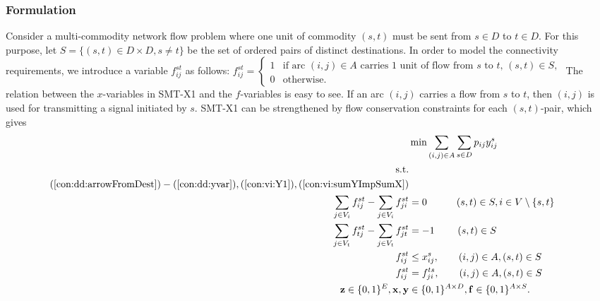 \subsubsection{Formulation}
\label{sec:smtx2:form}
Consider a multi-commodity network flow problem where one unit of commodity $(s,t)$ must be sent from $s\in D$ to $t\in D$. For this purpose, let $S=\{(s,t)\in D\times D, s\neq t\}$ be the set of ordered pairs of distinct destinations. In order to model the connectivity requirements, we introduce a variable $f^{st}_{ij}$ as follows:
\newline\newline
  $f_{ij}^{st}=
	\begin{cases}
    1 & \text{if arc $(i,j) \in A$ carries 1 unit of flow from $s$ to $t$, $(s,t)\in S$},\\
    0 & \text{otherwise}.
  \end{cases}$
\newline\newline
The relation between the $x$-variables in SMT-X1 and the $f$-variables is easy to see. If an arc $(i,j)$ carries a flow from $s$ to $t$, then $(i,j)$ is used for transmitting a signal initiated by $s$.
SMT-X1 can be strengthened by flow conservation constraints for each $(s,t)$-pair, which gives 
\newline
\newline    
\begin{subequations}\label{eq:smt-x2}
\begin{flalign}
\label{objective:dd} \makebox[0pt][l]{$\displaystyle{} \min \sum\limits_{(i,j) \in A} \sum\limits_{s \in D} p_{ij} y^s_{ij} $}  \\ 
\text{s.t.}    \notag   \\	
(\ref{con:dd:arrowFromDest}) - (\ref{con:dd:yvar}), (\ref{con:vi:Y1}), (\ref{con:vi:sumYImpSumX}) \notag \\ 
 \label{con:mf:flowNormal}  \sum\limits_{\substack{ j\in V_i}}f^{st}_{ij}-\sum\limits_{\substack{j\in V_i }}f^{st}_{ji}    & = 0   \quad \quad\quad 			  (s,t)\in S, i\in V\setminus\{s,t\} &\\	
\label{con:mf:flowDest}  \sum\limits_{\substack{ j\in V_t }}f^{st}_{tj}-\sum\limits_{\substack{j\in V_t}}f^{st}_{jt}    & = -1  \quad\quad ~ (s,t)\in S &\\	
 \label{con:mf:fcap}   f^{st}_{ij} &\leq  x^{s}_{ij},\quad\quad    (i,j)\in A, (s,t)\in S & \\ 		 			 	 
 \label{con:mf:fsym}   f^{st}_{ij} &=  f^{ts}_{ji},  \quad\quad(i,j)\in A, (s,t)\in S &\\   
\label{con:mf:xydim}	\mathbf{z} \in \{0,1\}^{E}, \mathbf{x},\mathbf{y} &\in \{0,1\}^{A\times D},  \mathbf{f}\in\{0,1\}^{A\times S}. 
\end{flalign}~
\end{subequations}  
